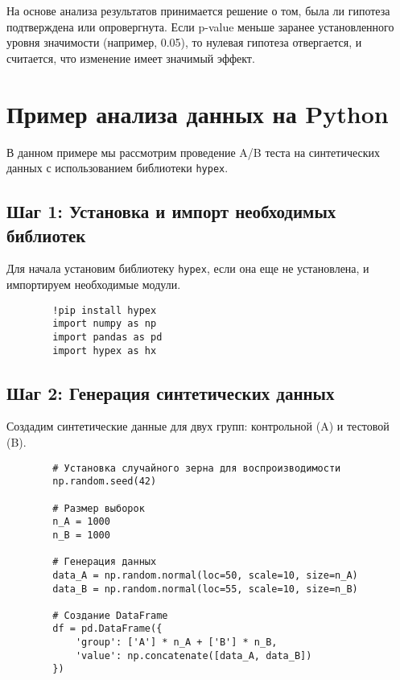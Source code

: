         На основе анализа результатов принимается решение о том, была ли гипотеза подтверждена или опровергнута.
        Если p-value меньше заранее установленного уровня значимости (например, 0.05), то нулевая гипотеза отвергается, и считается, что изменение имеет значимый эффект.


    \section*{Пример анализа данных на Python}

        В данном примере мы рассмотрим проведение A/B теста на синтетических данных с использованием библиотеки \texttt{hypex}.

        \subsection{Шаг 1: Установка и импорт необходимых библиотек}

        Для начала установим библиотеку \texttt{hypex}, если она еще не установлена, и импортируем необходимые модули.

        \begin{verbatim}
        !pip install hypex
        import numpy as np
        import pandas as pd
        import hypex as hx
        \end{verbatim}

        \subsection{Шаг 2: Генерация синтетических данных}

        Создадим синтетические данные для двух групп: контрольной (A) и тестовой (B).

        \begin{verbatim}
        # Установка случайного зерна для воспроизводимости
        np.random.seed(42)

        # Размер выборок
        n_A = 1000
        n_B = 1000

        # Генерация данных
        data_A = np.random.normal(loc=50, scale=10, size=n_A)
        data_B = np.random.normal(loc=55, scale=10, size=n_B)

        # Создание DataFrame
        df = pd.DataFrame({
            'group': ['A'] * n_A + ['B'] * n_B,
            'value': np.concatenate([data_A, data_B])
        })
        \end{verbatim}

